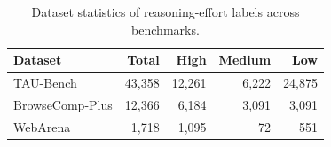 \begin{table}[t]
  \centering
  \small
  \setlength{\tabcolsep}{6pt}
  \renewcommand{\arraystretch}{1.15}
  \caption{Dataset statistics of reasoning-effort labels across benchmarks.}
  \begin{tabular}{l|r|rrr}
    \toprule
    \textbf{Dataset} & \textbf{Total} & \textbf{High} & \textbf{Medium} & \textbf{Low} \\
    \midrule
    TAU-Bench        & 43{,}358 & 12{,}261 & 6{,}222 & 24{,}875 \\
    BrowseComp-Plus  & 12{,}366 & 6{,}184  & 3{,}091 & 3{,}091  \\
    WebArena         & 1{,}718  & 1{,}095  & 72      & 551      \\
    \bottomrule
  \end{tabular}
  \label{tab:dataset}
\end{table}
